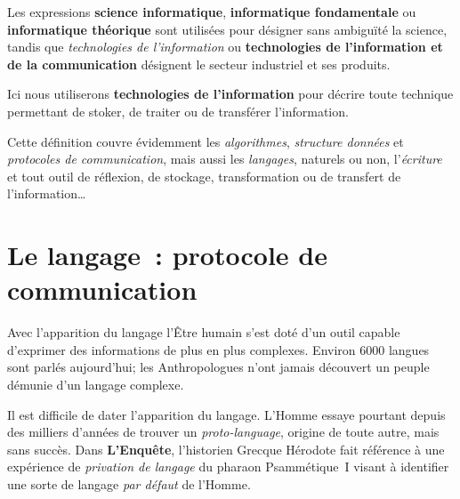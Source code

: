 \begin{coolquote}
Les expressions \textbf{science informatique}, \textbf{informatique fondamentale} ou \textbf{informatique théorique} sont utilisées pour désigner sans ambiguïté la science, tandis que \emph{technologies de l'information} ou \textbf{technologies de l'information et de la communication} désignent le secteur industriel et ses produits.
\end{coolquote}

Ici nous utiliserons \textbf{technologies de l'information} pour décrire toute technique permettant de stoker, de traiter ou de transférer l'information. 

Cette définition couvre évidemment les \emph{algorithmes}, \emph{structure données} et \emph{protocoles de communication}, mais aussi les \emph{langages}, naturels ou non, l'\emph{écriture} et tout outil de réflexion, de stockage, transformation ou de transfert de l'information\ldots

\chapter{Le langage~: protocole de communication}
Avec l'apparition du langage l'Être humain s'est doté d'un outil capable d'exprimer des informations de plus en plus complexes. Environ 6000 langues sont parlés aujourd'hui; les Anthropologues n'ont jamais découvert un peuple démunie d'un langage complexe\cite{linguistics-pinker}. 

Il est difficile de dater l'apparition du langage. L'Homme essaye pourtant depuis des milliers d'années de trouver un \emph{proto-language}, origine de toute autre, mais sans succès. Dans \textbf{L'Enquête}, l'historien Grecque Hérodote fait référence à une expérience de \emph{privation de langage} du pharaon Psammétique~I visant à identifier une sorte de langage \emph{par défaut} de l'Homme\cite{herodote-privation}. 

